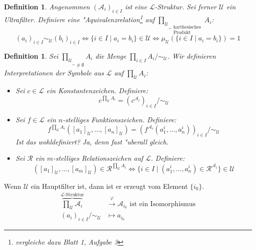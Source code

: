 \documentclass[a4paper,12pt,numbers=noenddot,parskip=full]{scrartcl}
\newcommand{\scrL}{\mathcal{L}}
\newcommand{\scrA}{\mathcal{A}}
\newcommand{\scrU}{\mathcal{U}}
\theoremstyle{dotless}
\newtheorem{definition}[theorem]{Definition}
\theoremstyle{remark}
\begin{document}
	\begin{definition}
		Angenommen $(\scrA_i)_{i \in I}$ ist eine $\scrL$-Struktur. Sei ferner $\scrU$ ein Ultrafilter. Definiere eine "Aquivalenzrelation\footnote{vergleiche dazu Blatt 1, Aufgabe 3} auf $\underbrace{\prod\limits_{\scrU}}_{\substack{\text{karthesisches}\\ \text{Produkt}}} A_i$:
		\begin{equation*}
			(a_i)_{i \in I} \sim_\scrU (b_i)_{i \in I} \Longleftrightarrow \{i \in I \mid a_i = b_i \} \in \scrU \Longleftrightarrow \mu_\scrU(\{i \in I \mid a_i = b_i \})=1
		\end{equation*}
	\end{definition}
	\begin{definition}
		Sei $\underbrace{\prod\limits_\scrU}_{\ne \emptyset} A_i$ die Menge $\prod\limits_{i \in I} A_i / \sim_\scrU$. Wir definieren Interpretationen der Symbole aus $\scrL$ auf $\prod\limits_{\scrU} A_i$:
		\begin{itemize}
			\item Sei $c \in \scrL$ ein Konstantenzeichen. Definiere:
			\begin{equation*}
				c^{\prod\limits_{\scrU} A_i} = (c^{\scrA_i})_{i \in I} / \sim_\scrU
			\end{equation*}
			\item Sei $f \in \scrL$ ein $n$-stelliges Funktionszeichen. Definiere:
			\begin{equation*}
				f^{\prod\limits_{\scrU} A_i} ([a_1]_\scrU, \dots, [a_n]_\scrU)= (f^{\scrA_i}(a_1^i, \dots, a_n^i))_{i \in I} / \sim_\scrU 
			\end{equation*}
			Ist das wohldefiniert? Ja, denn fast "uberall gleich.
			\item Sei $\mathcal{R}$ ein $m$-stelliges Relationszeichen auf $\scrL$. Definiere:
			\begin{equation*}
				([a_1]_\scrU, \dots, [a_m]_\scrU) \in \mathcal{R}^{\prod\limits_{\scrU} A_i} \Longleftrightarrow \{i \in I \mid (a_1^i, \dots, a_n^i) \in \mathcal{R}^{\scrA_i} \} \in \scrU
			\end{equation*}
		\end{itemize}
	\end{definition}
	Wenn $\scrU$ ein Hauptfilter ist, dann ist er erzeugt vom Element $\{i_0 \}$.
	\begin{align*}
		\overbrace{\prod\limits_{\scrU} \scrA_i}^{\scrL \text{-Struktur}} &\overset{\varphi}{\longrightarrow} \scrA_{i_0} \text{ ist ein Isomorphismus}\\
		(a_i)_{i \in I} / \sim_\scrU &\longmapsto a_{i_0}
	\end{align*}
	
\end{document}

